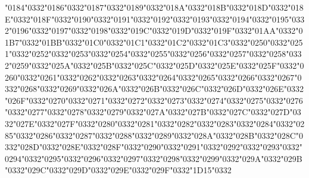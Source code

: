 \documentclass[landscape]{article}
\newcommand{\gs}{\hspace{0.5mm}}	%
\begin{document}
	\char"0184\char"0332\gs \char"0186\char"0332\gs \char"0187\char"0332\gs \char"0189\char"0332\gs \char"018A\char"0332\gs \char"018B\char"0332\gs \char"018D\char"0332\gs \char"018E\char"0332\gs \char"018F\char"0332\gs \char"0190\char"0332\gs \char"0191\char"0332\gs \char"0192\char"0332\gs \char"0193\char"0332\gs \char"0194\char"0332\gs \char"0195\char"0332\gs \char"0196\char"0332\gs \char"0197\char"0332\gs \char"0198\char"0332\gs \char"019C\char"0332\gs \char"019D\char"0332\gs \char"019F\char"0332\gs \char"01AA\char"0332\gs \char"01B7\char"0332\gs \char"01BB\char"0332\gs \char"01C0\char"0332\gs \char"01C1\char"0332\gs \char"01C2\char"0332\gs \char"01C3\char"0332\gs \char"0250\char"0332\gs \char"0251\char"0332\gs \char"0252\char"0332\gs \char"0253\char"0332\gs \char"0254\char"0332\gs \char"0255\char"0332\gs \char"0256\char"0332\gs \char"0257\char"0332\gs \char"0258\char"0332\gs \char"0259\char"0332\gs \char"025A\char"0332\gs \char"025B\char"0332\gs \char"025C\char"0332\gs \char"025D\char"0332\gs \char"025E\char"0332\gs \char"025F\char"0332\gs \char"0260\char"0332\gs \char"0261\char"0332\gs \char"0262\char"0332\gs \char"0263\char"0332\gs \char"0264\char"0332\gs \char"0265\char"0332\gs \char"0266\char"0332\gs \char"0267\char"0332\gs \char"0268\char"0332\gs \char"0269\char"0332\gs \char"026A\char"0332\gs \char"026B\char"0332\gs \char"026C\char"0332\gs \char"026D\char"0332\gs \char"026E\char"0332\gs \char"026F\char"0332\gs \char"0270\char"0332\gs \char"0271\char"0332\gs \char"0272\char"0332\gs \char"0273\char"0332\gs \char"0274\char"0332\gs \char"0275\char"0332\gs \char"0276\char"0332\gs \char"0277\char"0332\gs \char"0278\char"0332\gs \char"0279\char"0332\gs \char"027A\char"0332\gs \char"027B\char"0332\gs \char"027C\char"0332\gs \char"027D\char"0332\gs \char"027E\char"0332\gs \char"027F\char"0332\gs \char"0280\char"0332\gs \char"0281\char"0332\gs \char"0282\char"0332\gs \char"0283\char"0332\gs \char"0284\char"0332\gs \char"0285\char"0332\gs \char"0286\char"0332\gs \char"0287\char"0332\gs \char"0288\char"0332\gs \char"0289\char"0332\gs \char"028A\char"0332\gs \char"028B\char"0332\gs \char"028C\char"0332\gs \char"028D\char"0332\gs \char"028E\char"0332\gs \char"028F\char"0332\gs \char"0290\char"0332\gs \char"0291\char"0332\gs \char"0292\char"0332\gs \char"0293\char"0332\gs \char"0294\char"0332\gs \char"0295\char"0332\gs \char"0296\char"0332\gs \char"0297\char"0332\gs \char"0298\char"0332\gs \char"0299\char"0332\gs \char"029A\char"0332\gs \char"029B\char"0332\gs \char"029C\char"0332\gs \char"029D\char"0332\gs \char"029E\char"0332\gs \char"029F\char"0332\gs \char"1D15\char"0332
	
\end{document}
